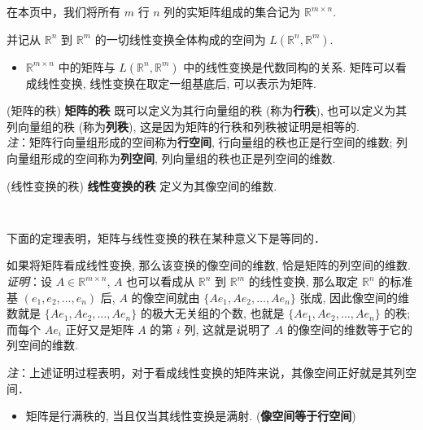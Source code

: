 
在本页中，我们将所有 $m$ 行 $n$ 列的实矩阵组成的集合记为 $\mathbb{R}^{m\times n}.$

并记从 $\mathbb{R}^{n}$ 到 $\mathbb{R}^{m}$ 的一切线性变换全体构成的空间为 $L(\mathbb{R}^{n},\mathbb{R}^{m}).$
\begin{itemize}
\item $\mathbb{R}^{m\times n}$ 中的矩阵与 $L(\mathbb{R}^{n},\mathbb{R}^{m})$
中的线性变换是代数同构的关系. 矩阵可以看成线性变换, 线性变换在取定一组基底后, 可以表示为矩阵. 
\end{itemize}

\begin{definition}{(矩阵的秩)}
\textbf{矩阵的秩} 既可以定义为其行向量组的秩 (称为\textbf{行秩}), 也可以定义为其列向量组的秩 (称为\textbf{列秩}),
这是因为矩阵的行秩和列秩被证明是相等的. \\

\textsl{注}：矩阵行向量组形成的空间称为\textbf{行空间}, 行向量组的秩也正是行空间的维数;
列向量组形成的空间称为\textbf{列空间}, 列向量组的秩也正是列空间的维数.
\end{definition}



\begin{definition}{(线性变换的秩)}
\textbf{线性变换的秩} 定义为其像空间的维数.
\end{definition} 
\verb| |

下面的定理表明，矩阵与线性变换的秩在某种意义下是等同的．
\begin{theorem}{}
 如果将矩阵看成线性变换, 那么该变换的像空间的维数, 恰是矩阵的列空间的维数.\\

\textsl{ 证明}：设 $A\in\mathbb{R}^{m\times n}$, $A$ 也可以看成从 $\mathbb{R}^{n}$ 到 $\mathbb{R}^{m}$
的线性变换, 那么取定 $\mathbb{R}^{n}$ 的标准基 $(e_{1},e_{2},\ldots,e_{n})$ 后,
$A$ 的像空间就由 $\{Ae_{1},Ae_{2},\ldots,Ae_{n}\}$ 张成, 因此像空间的维数就是 $\{Ae_{1},Ae_{2},\ldots,Ae_{n}\}$
的极大无关组的个数, 也就是 $\{Ae_{1},Ae_{2},\ldots,Ae_{n}\}$ 的秩; 而每个 $Ae_{i}$
正好又是矩阵 $A$ 的第 $i$ 列, 这就是说明了 $A$ 的像空间的维数等于它的列空间的维数. 
\end{theorem}

\textsl{注}：上述证明过程表明，对于看成线性变换的矩阵来说，其像空间正好就是其列空间． 

\begin{itemize}
\item 矩阵是行满秩的, 当且仅当其线性变换是满射. (\textbf{像空间等于行空间})
\end{itemize}

